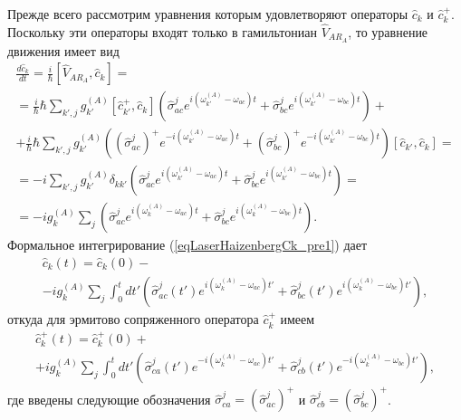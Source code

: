 Прежде всего рассмотрим уравнения которым удовлетворяют операторы
$\hat{c}_k$ и $\hat{c}_k^{+}$. Поскольку эти операторы входят только в
гамильтониан $\hat{V}_{AR_A}$, то уравнение движения имеет вид
\begin{eqnarray}
\frac{d \hat{c}_k}{d t} = \frac{i}{\hbar}\left[\hat{V}_{AR_A}, \hat{c}_k
\right] = 
\nonumber \\
= \frac{i}{\hbar} \hbar 
\sum_{k',j} 
g_{k'}^{(A)}\left[\hat{c}_{k'}^{+}, \hat{c}_k\right]
\left(
\hat{\sigma}_{ac}^{j} e^{i\left(\omega_{k'}^{(A)} - \omega_{ac}\right)t}
+
\hat{\sigma}_{bc}^{j} e^{i\left(\omega_{k'}^{(A)} - \omega_{bc}\right)t}
\right) +
\nonumber \\
+
\frac{i}{\hbar} \hbar 
\sum_{k',j} 
g_{k'}^{(A)}
\left(
\left(\hat{\sigma}_{ac}^{j}\right)^{+} e^{- i\left(\omega_{k'}^{(A)} - \omega_{ac}\right)t}
+
\left(\hat{\sigma}_{bc}^{j}\right)^{+} e^{- i\left(\omega_{k'}^{(A)} - \omega_{bc}\right)t}
\right)
\left[\hat{c}_{k'}, \hat{c}_k\right] =
\nonumber \\
= 
 - i 
\sum_{k',j} 
g_{k'}^{(A)}\delta_{kk'}
\left(
\hat{\sigma}_{ac}^{j} e^{i\left(\omega_{k'}^{(A)} - \omega_{ac}\right)t}
+
\hat{\sigma}_{bc}^{j} e^{i\left(\omega_{k'}^{(A)} - \omega_{bc}\right)t}
\right) = 
\nonumber \\
=
 - i g_{k}^{(A)}
\sum_{j} 
\left(
\hat{\sigma}_{ac}^{j} e^{i\left(\omega_{k}^{(A)} - \omega_{ac}\right)t}
+
\hat{\sigma}_{bc}^{j} e^{i\left(\omega_{k}^{(A)} - \omega_{bc}\right)t}
\right).
\label{eqLaserHaizenbergCk_pre1}
\end{eqnarray} 
Формальное интегрирование (\ref{eqLaserHaizenbergCk_pre1}) дает
\begin{eqnarray}
\hat{c}_k\left(t\right) = \hat{c}_k\left(0\right) -
\nonumber \\
 - i g_{k}^{(A)}
\sum_{j} 
\int_0^t d t'
\left(
\hat{\sigma}_{ac}^{j}\left(t'\right) e^{i\left(\omega_{k}^{(A)} - \omega_{ac}\right)t'}
+
\hat{\sigma}_{bc}^{j}\left(t'\right) e^{i\left(\omega_{k}^{(A)} - \omega_{bc}\right)t'}
\right),
\label{eqLaserHaizenbergCk}
\end{eqnarray}
откуда для эрмитово сопряженного оператора $\hat{c}_k^{+}$ имеем
\begin{eqnarray}
\hat{c}_k^{+}\left(t\right) = \hat{c}_k^{+}\left(0\right) +
\nonumber \\
 + i g_{k}^{(A)}
\sum_{j} 
\int_0^t d t'
\left(
\hat{\sigma}_{ca}^{j}\left(t'\right) e^{-i\left(\omega_{k}^{(A)} - \omega_{ac}\right)t'}
+
\hat{\sigma}_{cb}^{j}\left(t'\right) e^{-i\left(\omega_{k}^{(A)} - \omega_{bc}\right)t'}
\right),
\label{eqLaserHaizenbergCkPlus}
\end{eqnarray}
где введены следующие обозначения $\hat{\sigma}_{ca}^{j} =
\left(\hat{\sigma}_{ac}^{j}\right)^{+}$ и
$\hat{\sigma}_{cb}^{j} = \left(\hat{\sigma}_{bc}^{j}\right)^{+}$.

